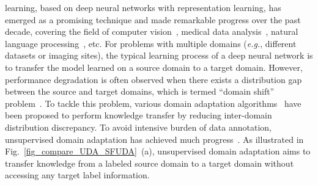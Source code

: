 \documentclass[10pt,journal,compsoc]{IEEEtran}
\def\eg{{\em e.g.}}
\begin{document}
\maketitle

 learning, based on deep neural networks with representation learning, has emerged as a promising technique and made remarkable progress over the past decade, covering the field of computer vision~\cite{voulodimos2018deep, hassaballah2020deep}, medical data analysis~\cite{shendg2017deep, litjens2017survey}, natural language processing~\cite{otter2020survey, young2018recent}, etc.
For problems with multiple domains (\eg, different datasets or imaging sites), the typical learning process of a deep neural network is to transfer the model learned on a source domain to a target domain. 
However, performance degradation is often observed when there exists a distribution gap between the source and target domains, which is termed ``domain shift'' problem~\cite{li2017deeperDG,sankaranarayanan2018learning,zhou2022domain}.
To tackle this problem, various domain adaptation algorithms~\cite{wang2018deepsurvey, guan2021domain} have been proposed to perform knowledge transfer by reducing inter-domain distribution discrepancy.
To avoid intensive burden of data annotation, unsupervised domain adaptation has achieved much progress~\cite{dong2021and, ganin2015unsupervised, saito2018maximum, fang2022unsupervised}. 
As illustrated in Fig.~\ref{fig_compare_UDA_SFUDA}~(a), unsupervised domain adaptation aims to transfer knowledge from a labeled source domain to a target domain without accessing any target label information. 
\end{document}
